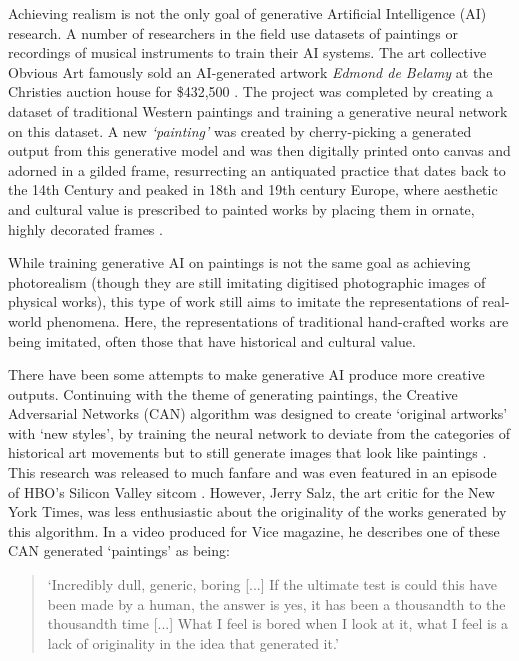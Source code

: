 Achieving realism is not the only goal of generative Artificial Intelligence (AI) research. 
A number of researchers in the field use datasets of paintings or recordings of musical instruments to train their AI systems. 
The art collective Obvious Art famously sold an AI-generated artwork \textit{Edmond de Belamy} at the Christies auction house for \$432,500 \citep{christies2018edmond}.
The project was completed by creating a dataset of traditional Western paintings and training a generative neural network on this dataset. 
A new \textit{`painting’} was created by cherry-picking a generated output from this generative model and was then digitally printed onto canvas and adorned in a gilded frame, resurrecting an antiquated practice that dates back to the 14th Century and peaked in 18th and 19th century Europe, where aesthetic and cultural value is prescribed to painted works by placing them in ornate, highly decorated frames \citep{kiilerich2001savedoff}.

While training generative AI on paintings is not the same goal as achieving photorealism (though they are still imitating digitised photographic images of physical works), this type of work still aims to imitate the representations of real-world phenomena. Here, the representations of traditional hand-crafted works are being imitated, often those that have historical and cultural value.

There have been some attempts to make generative AI produce more creative outputs. 
Continuing with the theme of generating paintings, the Creative Adversarial Networks (CAN) algorithm was designed to create ‘original artworks’ with ‘new styles’, by training the neural network to deviate from the categories of historical art movements but to still generate images that look like paintings \citep{elgammal2017can}. 
This research was released to much fanfare and was even featured in an episode of HBO’s Silicon Valley sitcom \citep{elhoseiny2019hbo}. 
However, Jerry Salz, the art critic for the New York Times, was less enthusiastic about the originality of the works generated by this algorithm. 
In a video produced for Vice magazine, he describes one of these CAN generated `paintings' as being:

\begin{quote}
`Incredibly dull, generic, boring [...] If the ultimate test is could this have been made by a human, the answer is yes, it has been a thousandth to the thousandth time [...] What I feel is bored when I look at it, what I feel is a lack of originality in the idea that generated it.' \citep{saltz2018aiart}
\end{quote}

